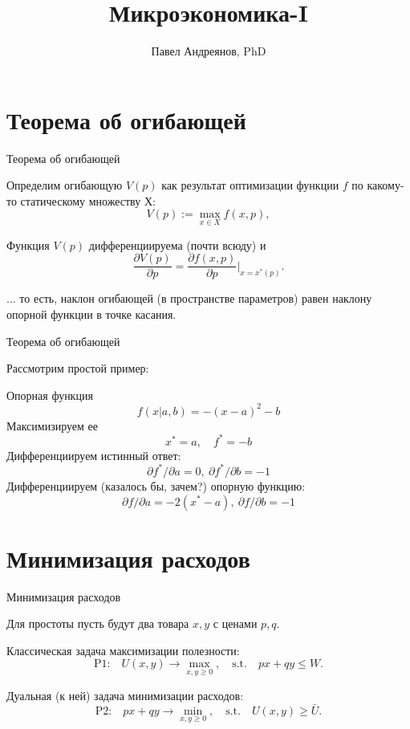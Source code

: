 \documentclass{beamer}
\title{
Микроэкономика-I
}
\author{
Павел Андреянов, PhD
}
\begin{document}
\maketitle

\section{Теорема об огибающей}

\begin{frame}{Теорема об огибающей}

Определим огибающую $V(p)$ как результат оптимизации функции $f$ по какому-то статическому множеству $Х$: 
$$ V(p) := \max_{x \in X} f(x, p),$$

\begin{theorem}[Об огибающей]
Функция $V(p)$ дифференциируема (почти всюду) и 
$$\frac{\partial V(p)}{\partial p} = \frac{\partial f(x, p)}{\partial p}|_{x = x^{\ast}(p)}.$$
\end{theorem}

... то есть, наклон огибающей (в пространстве параметров) равен наклону опорной функции в точке касания.

\end{frame}

\begin{frame}{Теорема об огибающей}

Рассмотрим простой пример:

Опорная функция $$ f(x|a,b) = - (x-a)^2 - b $$
Максимизируем ее $$ x^{\ast} = a, \quad f^{\ast} = - b $$
Дифференциируем истинный ответ: $$\partial f^{\ast}/\partial a = 0, \ \partial f^{\ast}/\partial b = -1$$
Дифференциируем (казалось бы, зачем?) опорную функцию: $$\partial f/\partial a = -2(x^{\ast}-a), \ \partial f/\partial b = -1$$
\end{frame}

\section{Минимизация расходов}

\begin{frame}{Минимизация расходов}

Для простоты пусть будут два товара $x, y$ с ценами $p, q$.

Классическая задача максимизации полезности:
$$\text{P1:} \quad U(x, y) \to \max_{x,y \geqslant 0}, \quad \text{s.t.} \quad p x + q y \leqslant W.$$

Дуальная (к ней) задача минимизации расходов:
$$\text{P2:} \quad p x + q y \to \min_{x,y \geqslant 0}, \quad \text{s.t.} \quad U(x,y) \geqslant \bar U.$$

\end{frame}
\end{document}
